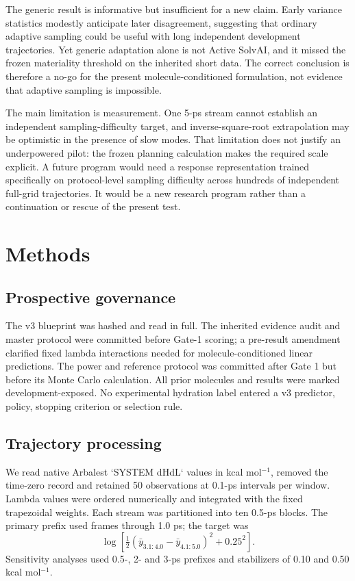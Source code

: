 \documentclass[11pt]{article}
\begin{document}
The generic result is informative but insufficient for a new claim. Early variance
statistics modestly anticipate later disagreement, suggesting that ordinary adaptive
sampling could be useful with long independent development trajectories. Yet generic
adaptation alone is not Active SolvAI, and it missed the frozen materiality threshold
on the inherited short data. The correct conclusion is therefore a no-go for the
present molecule-conditioned formulation, not evidence that adaptive sampling is
impossible.

The main limitation is measurement. One 5-ps stream cannot establish an independent
sampling-difficulty target, and inverse-square-root extrapolation may be optimistic in
the presence of slow modes. That limitation does not justify an underpowered pilot:
the frozen planning calculation makes the required scale explicit. A future program
would need a response representation trained specifically on protocol-level sampling
difficulty across hundreds of independent full-grid trajectories. It would be a new
research program rather than a continuation or rescue of the present test.

\section{Methods}

\subsection{Prospective governance}

The v3 blueprint was hashed and read in full. The inherited evidence audit and master
protocol were committed before Gate-1 scoring; a pre-result amendment clarified fixed
lambda interactions needed for molecule-conditioned linear predictions. The power and
reference protocol was committed after Gate 1 but before its Monte Carlo calculation.
All prior molecules and results were marked development-exposed. No experimental
hydration label entered a v3 predictor, policy, stopping criterion or selection rule.

\subsection{Trajectory processing}

We read native Arbalest `SYSTEM dHdL` values in kcal mol$^{-1}$, removed the time-zero
record and retained 50 observations at 0.1-ps intervals per window. Lambda values were
ordered numerically and integrated with the fixed trapezoidal weights. Each stream was
partitioned into ten 0.5-ps blocks. The primary prefix used frames through 1.0 ps; the
target was
\[
\log\left[\tfrac{1}{2}(\bar y_{3.1:4.0}-\bar y_{4.1:5.0})^2+0.25^2\right].
\]
Sensitivity analyses used 0.5-, 2- and 3-ps prefixes and stabilizers of 0.10 and
0.50 kcal mol$^{-1}$.
\end{document}
